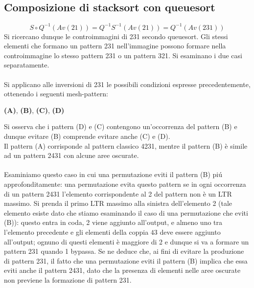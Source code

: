 \subsection{Composizione di {stacksort} con {queuesort}}
$$S\circ Q^{-1}(Av(21)) = Q^{-1}S^{-1}(Av(21)) = Q^{-1}(Av(231))$$
Si ricercano dunque le controimmagini di 231 secondo queuesort. Gli stessi elementi che formano un pattern 231 nell'immagine possono formare nella controimmagine lo stesso pattern 231 o un pattern 321. Si esaminano i due casi separatamente.\\\\
Si applicano alle inversioni di 231 le possibili condizioni espresse precedentemente, ottenendo i seguenti mesh-pattern:
\begin{center}
\textbf{(A)},
\textbf{(B)},
\textbf{(C)},
\textbf{(D)}
\end{center}
Si osserva che i pattern (D) e (C) contengono un'occorrenza del pattern (B) e dunque evitare (B) comprende evitare anche (C) e (D).\\
Il pattern (A) corrisponde al pattern classico 4231, mentre il pattern (B) \`e simile ad un pattern 2431 con alcune aree oscurate.\\\\
Esaminiamo questo caso in cui una permutazione eviti il pattern (B) pi\'u approfonditamente: una permutazione evita questo pattern se in ogni occorrenza di un pattern 2431 l'elemento corrispondente al 2 del pattern non \`e un LTR massimo. Si prenda il primo LTR massimo alla sinistra dell'elemento 2 (tale elemento esiste dato che stiamo esaminando il caso  di una permutazione che eviti (B)): questo entra in coda, 2 viene aggiunto all'output, e almeno uno tra l'elemento precedente e gli elementi della coppia $43$ deve essere aggiunto all'output; ognuno di questi elementi \`e maggiore di 2 e dunque si va a formare un pattern 231 quando 1 bypassa. Se ne deduce che, ai fini di evitare la produzione di pattern 231, il fatto che una permutazione eviti il pattern (B) implica che essa eviti anche il pattern 2431, dato che la presenza di elementi nelle aree oscurate non previene la formazione di pattern 231.\\\\
